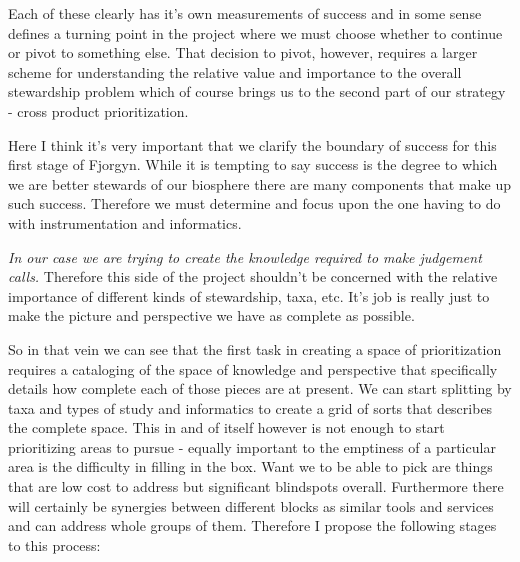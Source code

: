\documentclass[10pt,a5paper]{book}
\begin{document}
Each of these clearly has it's own measurements of success and in some sense defines a turning point in the project where we must choose whether to continue or pivot to something else. That decision to pivot, however, requires a larger scheme for understanding the relative value and importance to the overall stewardship problem which of course brings us to the second part of our strategy - cross product prioritization. 

Here I think it's very important that we clarify the boundary of success for this first stage of Fjorgyn. While it is tempting to say success is the degree to which we are better stewards of our biosphere there are many components that make up such success. Therefore we must determine and focus upon the one having to do with instrumentation and informatics. 

\textit{In our case we are trying to create the knowledge required to make judgement calls.} Therefore this side of the project shouldn't be concerned with the relative importance of different kinds of stewardship, taxa, etc. It's job is really just to make the picture and perspective we have as complete as possible.

So in that vein we can see that the first task in creating a space of prioritization requires a cataloging of the space of knowledge and perspective that specifically details how complete each of those pieces are at present. We can start splitting by taxa and types of study and informatics to create a grid of sorts that describes the complete space. This in and of itself however is not enough to start prioritizing areas to pursue - equally important to the emptiness of a particular area is the difficulty in filling in the box. Want we to be able to pick are things that are low cost to address but significant blindspots overall. Furthermore there will certainly be synergies between different blocks as similar tools and services and can address whole groups of them. Therefore I propose the following stages to this process:
\end{document}
